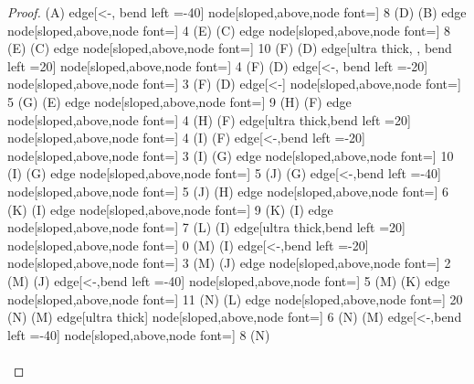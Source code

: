 \begin{proof}
{(A) edge[<-, bend left =-40] node[sloped,above,node font=\tiny] {8} (D)
(B) edge node[sloped,above,node font=\tiny] {4} (E)
(C) edge node[sloped,above,node font=\tiny] {8} (E)
(C) edge node[sloped,above,node font=\tiny] {10} (F)
(D) edge[ultra thick, , bend left =20] node[sloped,above,node font=\tiny] {4} (F)
(D) edge[<-, bend left =-20] node[sloped,above,node font=\tiny] {3} (F)
(D) edge[<-] node[sloped,above,node font=\tiny] {5} (G)
(E) edge node[sloped,above,node font=\tiny] {9} (H)
(F) edge node[sloped,above,node font=\tiny] {4} (H)
(F) edge[ultra thick,bend left =20] node[sloped,above,node font=\tiny] {4} (I)
(F) edge[<-,bend left =-20] node[sloped,above,node font=\tiny] {3} (I)
(G) edge node[sloped,above,node font=\tiny] {10} (I)
(G) edge node[sloped,above,node font=\tiny] {5} (J)
(G) edge[<-,bend left =-40] node[sloped,above,node font=\tiny] {5} (J)
(H) edge node[sloped,above,node font=\tiny] {6} (K)
(I) edge node[sloped,above,node font=\tiny] {9} (K)
(I) edge node[sloped,above,node font=\tiny] {7} (L)
(I) edge[ultra thick,bend left =20] node[sloped,above,node font=\tiny] {0} (M)
(I) edge[<-,bend left =-20] node[sloped,above,node font=\tiny] {3} (M)
(J) edge node[sloped,above,node font=\tiny] {2} (M)
(J) edge[<-,bend left =-40] node[sloped,above,node font=\tiny] {5} (M)
(K) edge node[sloped,above,node font=\tiny] {11} (N)
(L) edge node[sloped,above,node font=\tiny] {20} (N)
(M) edge[ultra thick] node[sloped,above,node font=\tiny] {6} (N)
(M) edge[<-,bend left =-40] node[sloped,above,node font=\tiny] {8} (N)
}\\\\
\usetikzlibrary{graphs,automata,positioning}
\end{proof}
